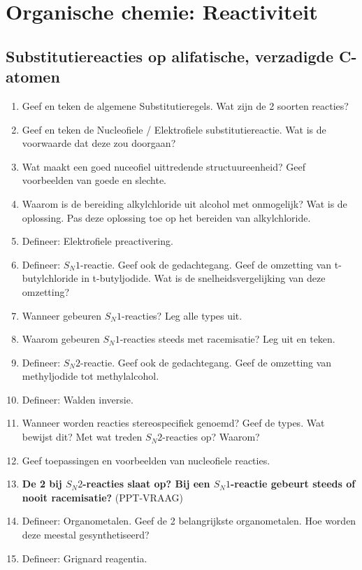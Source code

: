 \documentclass[a4paper,12pt]{article}
\begin{document}
    \section{Organische chemie: Reactiviteit}
    \subsection*{Substitutiereacties op alifatische, verzadigde C-atomen}
    \begin{enumerate}
        \item Geef en teken de algemene Substitutieregels. Wat zijn de 2 soorten reacties?
        \item Geef en teken de Nucleofiele / Elektrofiele substitutiereactie. Wat is de voorwaarde dat deze zou doorgaan?
        \item Wat maakt een goed nuceofiel uittredende structuureenheid? Geef voorbeelden van goede en slechte.
        \item Waarom is de bereiding alkylchloride uit alcohol met  onmogelijk? Wat is de oplossing. Pas deze oplossing toe op het bereiden van alkylchloride.
        \item Defineer: Elektrofiele preactivering.
        \item Defineer: $S_N1$-reactie. Geef ook de gedachtegang. Geef de omzetting van t-butylchloride in t-butyljodide. Wat is de snelheidsvergelijking van deze omzetting?
        \item Wanneer gebeuren $S_N1$-reacties? Leg alle types uit.
        \item Waarom gebeuren $S_N1$-reacties steeds met racemisatie? Leg uit en teken.
        \item Defineer: $S_N2$-reactie. Geef ook de gedachtegang. Geef de omzetting van methyljodide tot methylalcohol.
        \item Defineer: Walden inversie.
        \item Wanneer worden reacties stereospecifiek genoemd? Geef de types. Wat bewijst dit? Met wat treden $S_N2$-reacties op? Waarom?
        \item Geef toepassingen en voorbeelden van nucleofiele reacties.
        \item \textbf{De 2 bij $S_N2$-reacties slaat op? Bij een $S_N1$-reactie gebeurt steeds of nooit racemisatie?} (PPT-VRAAG)
        \item Defineer: Organometalen. Geef de 2 belangrijkste organometalen. Hoe worden deze meestal gesynthetiseerd? 
        \item Defineer: Grignard reagentia. 

\end{enumerate}
\end{document}
